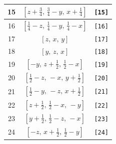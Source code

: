\documentclass[fleqn,8pt]{jsarticle}
\begin{document}
\begin{longtable}{ccc}
15 & $\left[ z + \frac{3}{4},\, \frac{3}{4} - y,\, x + \frac{1}{4} \right]$ & {\tt [15]} \\ \hline
16 & $\left[ \frac{1}{4} - z,\, \frac{1}{4} - y,\, \frac{1}{4} - x \right]$ & {\tt [16]} \\ \hline
17 & $\left[ z,\, x,\, y \right]$ & {\tt [17]} \\ \hline
18 & $\left[ y,\, z,\, x \right]$ & {\tt [18]} \\ \hline
19 & $\left[ - y,\, z + \frac{1}{2},\, \frac{1}{2} - x \right]$ & {\tt [19]} \\ \hline
20 & $\left[ \frac{1}{2} - z,\, - x,\, y + \frac{1}{2} \right]$ & {\tt [20]} \\ \hline
21 & $\left[ \frac{1}{2} - y,\, - z,\, x + \frac{1}{2} \right]$ & {\tt [21]} \\ \hline
22 & $\left[ z + \frac{1}{2},\, \frac{1}{2} - x,\, - y \right]$ & {\tt [22]} \\ \hline
23 & $\left[ y + \frac{1}{2},\, \frac{1}{2} - z,\, - x \right]$ & {\tt [23]} \\ \hline
24 & $\left[ - z,\, x + \frac{1}{2},\, \frac{1}{2} - y \right]$ & {\tt [24]} \\
\end{longtable}
\end{document}
